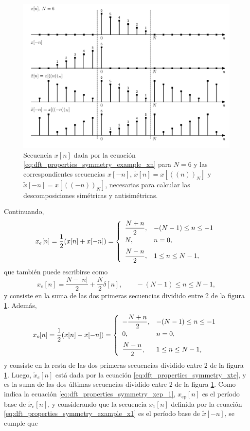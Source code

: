\documentclass[a4paper]{report}
\begin{document}
\begin{figure}[!htb]
 \begin{center}
 \includegraphics[width=1\textwidth]{figuras/dft_properties_symmetry_signals.pdf}
 \caption{\label{fig:dft_properties_symmetry_signals} Secuencia \(x[n]\) dada por la ecuación \ref{eq:dft_properties_symmetry_example_xn} para \(N=6\) y las correspondientes secuencias \(x[-n]\), \(\tilde{x}[n]=x[((n))_N]\) y \(\tilde{x}[-n]=x[((-n))_N]\), necesarias para calcular las descomposiciones simétricas y antisimétricas.}
 \end{center}
\end{figure}
Continuando, 
\[
 x_e[n]=\frac{1}{2}(x[n]+x[-n])=
 \left\{ 
 \begin{array}{ll}
  \dfrac{N+n}{2}, & -(N-1)\leq n\leq-1\\[\medskipamount]
  N, & n=0,\\[\medskipamount]
 \dfrac{N-n}{2}, & 1\leq n\leq N-1,
 \end{array}
 \right.
\]
que también puede escribirse como 
\[
 x_e[n]=\frac{N-|n|}{2}+\frac{N}{2}\delta[n],\qquad -(N-1)\leq n\leq N-1,
\]
y consiste en la suma de las dos primeras secuencias dividido entre 2 de la figura \ref{fig:dft_properties_symmetry_signals}. Además,
\[
 x_o[n]=\frac{1}{2}(x[n]-x[-n])=
 \left\{ 
 \begin{array}{ll}
  -\dfrac{N+n}{2}, & -(N-1)\leq n\leq-1\\[\medskipamount]
  0, & n=0,\\[\medskipamount]
 \dfrac{N-n}{2}, & 1\leq n\leq N-1,
 \end{array}
 \right.
\]
y consiste en la resta de las dos primeras secuencias dividido entre 2 de la figura \ref{fig:dft_properties_symmetry_signals}. Luego, \(\tilde{x}_e[n]\) está dada por la ecuación \ref{eq:dft_properties_symmetry_xte}, y es la suma de las dos últimas secuencias dividido entre 2 de la figura \ref{fig:dft_properties_symmetry_signals}. Como indica la ecuación \ref{eq:dft_properties_symmetry_xep_1}, \(x_\textrm{ep}[n]\) es el período base de \(\tilde{x}_e[n]\), y considerando que la secuencia \(x_1[n]\) definida por la ecuación \ref{eq:dft_properties_symmetry_example_x1} es el período base de \(\tilde{x}[-n]\), se cumple que
\end{document}
